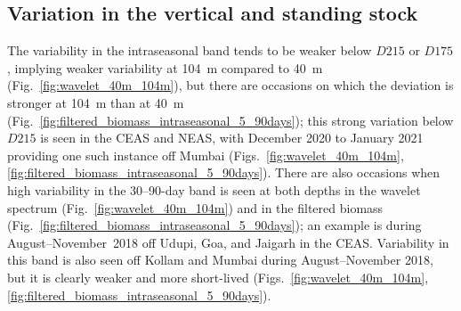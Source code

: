 \documentclass[authoryear,review,11pt]{elsarticle}
\begin{document}
%
%
%
%

\subsection{Variation in the vertical and standing stock}
\label{sec:intraseasonal.ss}

The variability in the intraseasonal band tends to be weaker below $D215$ or $D175$, implying weaker variability at 104~m compared to 40~m (Fig.~\ref{fig:wavelet_40m_104m}), but there are occasions on which the deviation is stronger at 104~m than at 40~m (Fig.~\ref{fig:filtered_biomass_intraseasonal_5_90days}); this strong variation below $D215$ is seen in the CEAS and NEAS, with December 2020 to January 2021 providing one such instance off Mumbai (Figs.~\ref{fig:wavelet_40m_104m},\ref{fig:filtered_biomass_intraseasonal_5_90days}). There are also occasions when high variability in the 30--90-day band is seen at both depths in the wavelet spectrum (Fig.~\ref{fig:wavelet_40m_104m}) and in the filtered biomass (Fig.~\ref{fig:filtered_biomass_intraseasonal_5_90days}); an example is during August--November~2018 off Udupi, Goa, and Jaigarh in the CEAS. Variability in this band is also seen off Kollam and Mumbai during  August--November 2018, but it is clearly weaker and more short-lived (Figs.~\ref{fig:wavelet_40m_104m},\ref{fig:filtered_biomass_intraseasonal_5_90days}).
\end{document}
